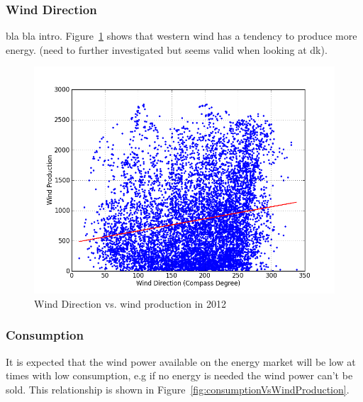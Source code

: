 \subsubsection{Wind Direction}
bla bla intro. Figure~\ref{fig:windDirVsProd} shows that western wind has a tendency to produce more energy. (need to further investigated but seems valid when looking at dk).
\begin{figure}[h!]
\centering
\includegraphics[width=0.99\linewidth,natwidth=898,natheight=587]{billeder/productionVsWindDirection.png}
\caption{Wind Direction vs. wind production in 2012}
\label{fig:windDirVsProd}
\end{figure}

\subsubsection{Consumption}
It is expected that the wind power available on the energy market will be low at times with low consumption, e.g if no energy is needed the wind power can't be sold.  This relationship is shown in Figure~\ref{fig:consumptionVsWindProduction}.

